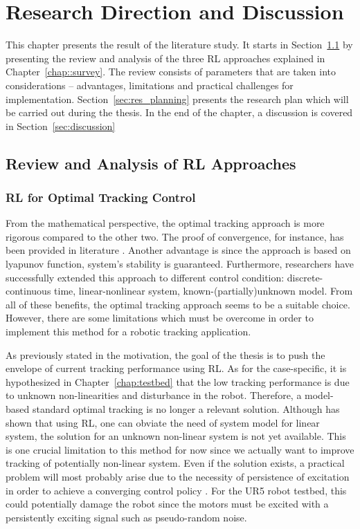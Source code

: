 \chapter{Research Direction and Discussion}

This chapter presents the result of the literature study. It starts in Section~\ref*{sec:review} by presenting the review and analysis of the three \acs {RL} approaches explained in Chapter~\ref{chap::survey}. The review consists of parameters that are taken into considerations -- advantages, limitations and practical challenges for implementation. Section~\ref{sec:res_planning} presents the research plan which will be carried out during the thesis. In the end of the chapter, a discussion is covered in Section~\ref{sec:discussion}
\section{Review and Analysis of \acs{RL} Approaches} \label{sec:review}
\subsection{{\acs{RL} for Optimal Tracking Control}}
From the mathematical perspective, the optimal tracking approach is more rigorous compared to the other two. The proof of convergence, for instance, has been provided in literature \cite{1099755}. Another advantage is since the approach is based on lyapunov function, system's stability is guaranteed. Furthermore, researchers have successfully extended this approach to different control condition: discrete-continuous time, linear-nonlinear system, known-(partially)unknown model. From all of these benefits, the optimal tracking approach seems to be a suitable choice. However, there are some limitations which must be overcome in order to implement this method for a robotic tracking application.

As previously stated in the motivation, the goal of the thesis is to push the envelope of current tracking performance using \acs {RL}. As for the case-specific, it is hypothesized in Chapter~\ref{chap:testbed} that the low tracking performance is due to unknown non-linearities and disturbance in the robot. Therefore, a model-based standard optimal tracking is no longer a relevant solution. Although \cite{Kiumarsi20141167} has shown that using \acs{RL}, one can obviate the need of system model for linear system, the solution for an unknown non-linear system is not yet available. This is one crucial limitation to this method for now since we actually want to improve tracking of potentially non-linear system. Even if the solution exists, a practical problem will most probably arise due to the necessity of persistence of excitation in order to achieve a converging control policy \cite{Kiumarsi20141167} \cite{AlTamimi2007473}. For the UR5 robot testbed, this could potentially damage the robot since the motors must be excited with a persistently exciting signal such as pseudo-random noise. 

